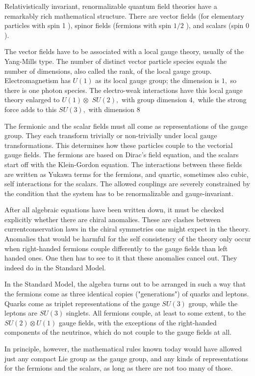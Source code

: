 \documentclass[main.tex]{subfiles}
\begin{document}
Relativistically invariant, renormalizable quantum field theories have a remarkably rich mathematical structure. There are vector fields (for elementary particles with spin 1 ), spinor fields (fermions with spin $1 / 2$ ), and scalars (spin 0 ).

The vector fields have to be associated with a local gauge theory, usually of the Yang-Mills type. The number of distinct vector particle species equals the number of dimensions, also called the rank, of the local gauge group. Electromagnetism has
$U(1)$ as its local gauge group; the dimension is $1,$ so there is one photon species. The electro-weak interactions have this local gauge theory enlarged to $U(1) \otimes$ $S U(2),$ with group dimension $4,$ while the strong force adds to this $S U(3),$ with dimension 8

The fermionic and the scalar fields must all come as representations of the gauge group. They each transform trivially or non-trivially under local gauge transformations. This determines how these particles couple to the vectorial gauge fields. The fermions are based on Dirac's field equation, and the scalars start off with the Klein-Gordon equation. The interactions between these fields are written as Yukawa terms for the fermions, and quartic, sometimes also cubic, self interactions for the scalars. The allowed couplings are severely constrained by the condition that the system has to be renormalizable and gauge-invariant.

After all algebraic equations have been written down, it must be checked explicitly whether there are chiral anomalies. These are clashes between currentconservation laws in the chiral symmetries one might expect in the theory. Anomalies that would be harmful for the self consistency of the theory only occur when right-handed fermions couple differently to the gauge fields than left handed ones. One then has to see to it that these anomalies cancel out. They indeed do in the Standard Model.

In the Standard Model, the algebra turns out to be arranged in such a way that the fermions come as three identical copies ("generations") of quarks and leptons. Quarks come as triplet representations of the gauge $S U(3)$ group, while the leptons are $S U(3)$ singlets. All fermions couple, at least to some extent, to the $S U(2) \otimes U(1)$ gauge fields, with the exceptions of the right-handed components of the neutrinos, which do not couple to the gauge fields at all.

In principle, however, the mathematical rules known today would have allowed just any compact Lie group as the gauge group, and any kinds of representations for the fermions and the scalars, as long as there are not too many of those.
\end{document}
